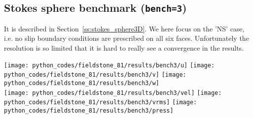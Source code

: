 \subsection*{Stokes sphere benchmark ({\tt bench=3})}

It is described in Section~\ref{ss:stokes_sphere3D}. We here focus on the 'NS' case, i.e. no slip 
boundary conditions are prescribed on all six faces. Unfortunately the resolution is so limited 
that it is hard to really see a convergence in the results.

\begin{center}
\texttt{[image: python\_codes/fieldstone\_81/results/bench3/u]}
\texttt{[image: python\_codes/fieldstone\_81/results/bench3/v]}
\texttt{[image: python\_codes/fieldstone\_81/results/bench3/w]}\\
\texttt{[image: python\_codes/fieldstone\_81/results/bench3/vel]}
\texttt{[image: python\_codes/fieldstone\_81/results/bench3/vrms]}
\texttt{[image: python\_codes/fieldstone\_81/results/bench3/press]}
\end{center}




















 
